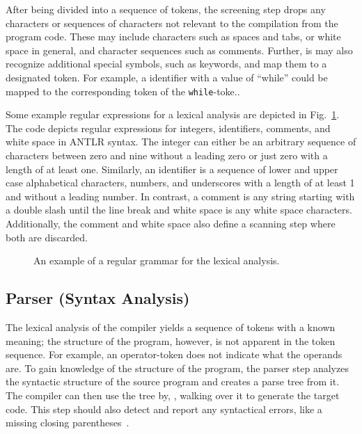 After being divided into a sequence of tokens, the screening step drops any characters or sequences of characters not relevant to the compilation from the program code. 
These may include characters such as spaces and tabs, or white space in general, and character sequences such as comments. 
Further, is may also recognize additional special symbols, such as keywords, and map them to a designated token. For example, a identifier with a value of ``while'' could be mapped to the corresponding token of the \texttt{while}-toke.\cite{DeRe74}.

Some example regular expressions for a lexical analysis are depicted in Fig.~\ref{fig:example_lexer}. The code depicts regular expressions for integers, identifiers, comments, and white space in ANTLR syntax.
The integer can either be an arbitrary sequence of characters between zero and nine without a leading zero or just zero with a length of at least one. Similarly, an identifier is a sequence of lower and upper case alphabetical characters, numbers, and underscores with a length of at least 1 and without a leading number. In contrast, a comment is any string starting with a double slash until the line break and white space is any white space characters. Additionally, the comment and white space also define a scanning step where both are discarded.

\begin{figure}[htp]
    \centering
    
    \caption{An example of a regular grammar for the lexical analysis.}
    \label{fig:example_lexer}
\end{figure}

\subsection{Parser (Syntax Analysis)}
\label{sec:background_parser}
The lexical analysis of the compiler yields a sequence of tokens with a known meaning; the structure of the program, however, is not apparent in the token sequence. For example, an operator-token does not indicate what the operands are. To gain knowledge of the structure of the program, the parser step analyzes the syntactic structure of the source program and creates a parse tree from it. The compiler can then use the tree by, \eg, walking over it to generate the target code. This step should also detect and report any syntactical errors, like a missing closing parentheses~\cite{VSSD07}.

